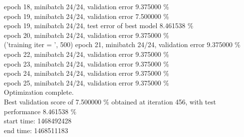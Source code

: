 \documentclass[a4paper]{article}
\begin{document}
epoch 18, minibatch 24/24, validation error 9.375000 \% \\
epoch 19, minibatch 24/24, validation error 7.500000 \% \\
     epoch 19, minibatch 24/24, test error of best model 8.461538 \% \\
epoch 20, minibatch 24/24, validation error 9.375000 \% \\
('training \@ iter = ', 500)
epoch 21, minibatch 24/24, validation error 9.375000 \% \\
epoch 22, minibatch 24/24, validation error 9.375000 \% \\
epoch 23, minibatch 24/24, validation error 9.375000 \% \\
epoch 24, minibatch 24/24, validation error 9.375000 \% \\
epoch 25, minibatch 24/24, validation error 9.375000 \% \\
Optimization complete.\\
Best validation score of 7.500000 \% obtained at iteration 456, with test performance 8.461538 \% \\
start time: 1468492428 \\
end time: 1468511183 \\
\end{document}
